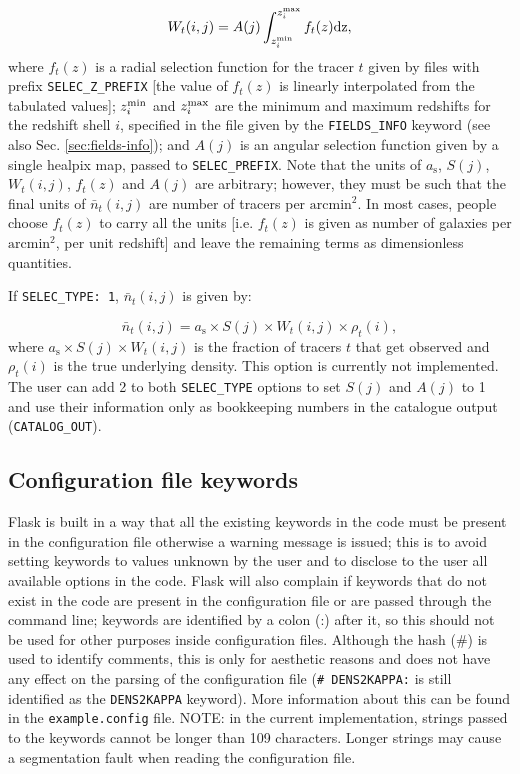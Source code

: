 \documentclass[12pt]{book} %
\begin{document}
\begin{equation}
W_t(i,j) = A(j)\int_{z^{\rm{min}}_i}^{z^{\rm{max}}_i} f_t(z) \rm{d}z,  
\label{eq:separable-selection-function} 
\end{equation}
where $f_t(z)$ is a radial selection function for the tracer $t$ 
given by files with prefix {\tt SELEC\_Z\_PREFIX} [the value of $f_t(z)$ 
is linearly interpolated from the tabulated values]; $z^{\rm{min}}_i$ and 
$z^{\rm{max}}_i$ are the minimum and maximum redshifts for the redshift shell $i$, 
specified in the file given by the {\tt FIELDS\_INFO} keyword (see also Sec. 
\ref{sec:fields-info}); and $A(j)$ is an 
angular selection function given by a single {\sc healpix} map, passed to {\tt SELEC\_PREFIX}. 
Note that the units of $a_{\mathrm{s}}$, $S(j)$, $W_t(i,j)$, $f_t(z)$ and $A(j)$ are arbitrary; 
however, they must be such that the final units of $\bar{n}_t(i,j)$ are number of tracers 
per $\mathrm{arcmin}^2$. In most cases, people choose $f_t(z)$ to carry 
all the units [i.e. $f_t(z)$ is given as number of galaxies per $\mathrm{arcmin}^2$, 
per unit redshift] and leave the remaining terms as dimensionless quantities.

If {\tt SELEC\_TYPE: 1}, $\bar{n}_t(i,j)$ is given by:

\begin{equation}
\bar{n}_t(i,j) = a_{\mathrm{s}} \times S(j) \times W_t(i,j) \times \rho_t(i),
\label{eq:fraction-selection-function} 
\end{equation}
where $a_{\mathrm{s}} \times S(j) \times W_t(i,j)$ is the fraction of tracers $t$ 
that get observed and $\rho_t(i)$ is the true underlying density. This option is 
currently not implemented. The user can add 2 to both {\tt SELEC\_TYPE} options 
to set $S(j)$ and $A(j)$ to 1 and use their information only as bookkeeping numbers 
in the catalogue output ({\tt CATALOG\_OUT}). 


\subsection{Configuration file keywords}
\label{sec:keywords}

{\sc Flask} is built in a way that all the existing keywords in the code must be present in the 
configuration file otherwise a warning message is issued; this is to avoid setting keywords to 
values unknown by the user and to disclose to the user all available options in the code. 
{\sc Flask} will also complain if keywords that do not exist in the code are present in the 
configuration file or are passed through the command line; keywords are identified by a colon (:) 
after it, so this should not be used for other purposes inside configuration files. Although 
the hash (\#) is used to identify comments, this is only for aesthetic reasons and does not have 
any effect on the parsing of the configuration file ({\tt \# DENS2KAPPA:} is still identified as 
the {\tt DENS2KAPPA} keyword). More information about this can be found in the {\tt example.config} 
file. 
NOTE: in the current implementation, strings passed to the keywords cannot be longer than 109 
characters. Longer strings may cause a segmentation fault when reading the configuration file. 
\end{document}
